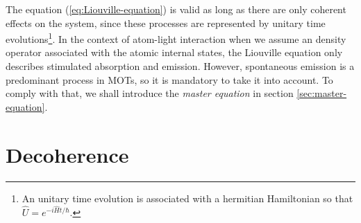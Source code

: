 The equation (\ref{eq:Liouville-equation}) is valid as long as there are only coherent effects on the system,  since these processes are represented by unitary time evolutions\footnote{An unitary time evolution is associated with a hermitian Hamiltonian so that $ \hat{U} = e^{-i \hat{H}t / \hbar} $.}. In the context of atom-light interaction when we assume an density operator associated with the atomic internal states, the Liouville equation only describes stimulated absorption and emission. However, spontaneous emission is a predominant process in MOTs, so it is mandatory to take it into account. To comply with that, we shall introduce the \textit{master equation} in section \ref{sec:master-equation}.

%
\section{Decoherence}
\label{sec:master-equation-decoherence}
%

